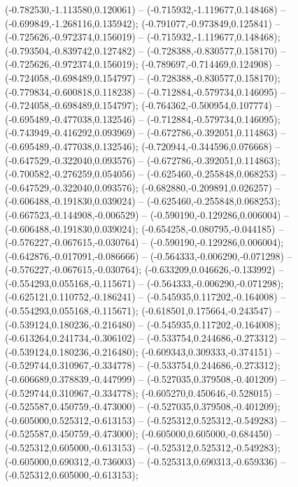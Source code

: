  (-0.782530,-1.113580,0.120061) -- (-0.715932,-1.119677,0.148468) -- (-0.699849,-1.268116,0.135942);
 (-0.791077,-0.973849,0.125841) -- (-0.725626,-0.972374,0.156019) -- (-0.715932,-1.119677,0.148468);
 (-0.793504,-0.839742,0.127482) -- (-0.728388,-0.830577,0.158170) -- (-0.725626,-0.972374,0.156019);
 (-0.789697,-0.714469,0.124908) -- (-0.724058,-0.698489,0.154797) -- (-0.728388,-0.830577,0.158170);
 (-0.779834,-0.600818,0.118238) -- (-0.712884,-0.579734,0.146095) -- (-0.724058,-0.698489,0.154797);
 (-0.764362,-0.500954,0.107774) -- (-0.695489,-0.477038,0.132546) -- (-0.712884,-0.579734,0.146095);
 (-0.743949,-0.416292,0.093969) -- (-0.672786,-0.392051,0.114863) -- (-0.695489,-0.477038,0.132546);
 (-0.720944,-0.344596,0.076668) -- (-0.647529,-0.322040,0.093576) -- (-0.672786,-0.392051,0.114863);
 (-0.700582,-0.276259,0.054056) -- (-0.625460,-0.255848,0.068253) -- (-0.647529,-0.322040,0.093576);
 (-0.682880,-0.209891,0.026257) -- (-0.606488,-0.191830,0.039024) -- (-0.625460,-0.255848,0.068253);
 (-0.667523,-0.144908,-0.006529) -- (-0.590190,-0.129286,0.006004) -- (-0.606488,-0.191830,0.039024);
 (-0.654258,-0.080795,-0.044185) -- (-0.576227,-0.067615,-0.030764) -- (-0.590190,-0.129286,0.006004);
 (-0.642876,-0.017091,-0.086666) -- (-0.564333,-0.006290,-0.071298) -- (-0.576227,-0.067615,-0.030764);
 (-0.633209,0.046626,-0.133992) -- (-0.554293,0.055168,-0.115671) -- (-0.564333,-0.006290,-0.071298);
 (-0.625121,0.110752,-0.186241) -- (-0.545935,0.117202,-0.164008) -- (-0.554293,0.055168,-0.115671);
 (-0.618501,0.175664,-0.243547) -- (-0.539124,0.180236,-0.216480) -- (-0.545935,0.117202,-0.164008);
 (-0.613264,0.241734,-0.306102) -- (-0.533754,0.244686,-0.273312) -- (-0.539124,0.180236,-0.216480);
 (-0.609343,0.309333,-0.374151) -- (-0.529744,0.310967,-0.334778) -- (-0.533754,0.244686,-0.273312);
 (-0.606689,0.378839,-0.447999) -- (-0.527035,0.379508,-0.401209) -- (-0.529744,0.310967,-0.334778);
 (-0.605270,0.450646,-0.528015) -- (-0.525587,0.450759,-0.473000) -- (-0.527035,0.379508,-0.401209);
 (-0.605000,0.525312,-0.613153) -- (-0.525312,0.525312,-0.549283) -- (-0.525587,0.450759,-0.473000);
 (-0.605000,0.605000,-0.684450) -- (-0.525312,0.605000,-0.613153) -- (-0.525312,0.525312,-0.549283);
 (-0.605000,0.690312,-0.736003) -- (-0.525313,0.690313,-0.659336) -- (-0.525312,0.605000,-0.613153);
